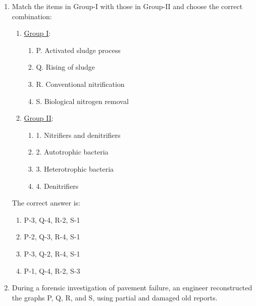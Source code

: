\documentclass[journal]{IEEEtran}
\begin{document}
\begin{enumerate}
    \item Match the items in Group-I with those in Group-II and choose the correct combination:
    \begin{multicols}{2}
        
        \begin{enumerate}
            \item \underline{Group I}:
                \begin{enumerate}
                    \item P. Activated sludge process
                    \item Q. Rising of sludge
                    \item R. Conventional nitrification
                    \item S. Biological nitrogen removal
                \end{enumerate}
            \item \underline{Group II}:
                \begin{enumerate}
                    \item 1. Nitrifiers and denitrifiers
                    \item 2. Autotrophic bacteria
                    \item 3. Heterotrophic bacteria
                    \item 4. Denitrifiers
                \end{enumerate}
        \end{enumerate}
            \end{multicols}

        The correct answer is:
        \begin{multicols}{2}
            
        \begin{enumerate}
            \item  P-3, Q-4, R-2, S-1
            \item  P-2, Q-3, R-4, S-1
            \item  P-3, Q-2, R-4, S-1
            \item  P-1, Q-4, R-2, S-3
        \end{enumerate}
                \end{multicols}


    \item During a forensic investigation of pavement failure, an engineer reconstructed the graphs P, Q, R, and S, using partial and damaged old reports. 


\end{enumerate}
\end{document}
